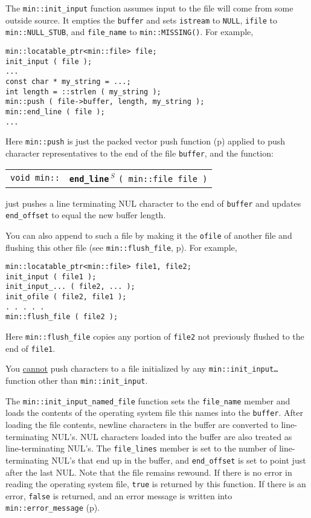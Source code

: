 \documentclass[12pt]{article}
\makeatletter
\newcommand{\ttindex}[1]{\index{#1@{\tt #1}}}
\newcommand{\minindex}[1]{\ttindex{min::#1}\ttindex{#1}}
\newcommand{\pagref}[1]{p\pageref{#1}}
\newcommand{\EOL}{\penalty \exhyphenpenalty}
\newenvironment{indpar}[1][0.3in]%
	{\begin{list}{}%
		     {\setlength{\itemsep}{0in}%
		      \setlength{\topsep}{0in}%
		      \setlength{\parsep}{1ex}%
		      \setlength{\labelwidth}{#1}%
		      \setlength{\leftmargin}{#1}%
		      \addtolength{\leftmargin}{\labelsep}}%
	 \item}%
	{\end{list}}
\newcommand{\LABEL}[1]{\label{#1}}
\newcommand{\MINKEY}[1]{{\tt \bf #1}\minindex{#1}}
\newcommand{\RESIZE}{$\,^S$}
\makeatother
\begin{document}
The {\tt min::init\_input} function assumes
input to the file will come from some outside source.  It empties the
{\tt buffer} and sets
{\tt istream} to {\tt NULL}, {\tt ifile} to {\tt min::\EOL NULL\_\EOL STUB},
and {\tt file\_\EOL name} to {\tt min::\EOL MISSING()}.
For example,\label{WRITING-FILE-BUFFER}
\begin{indpar}\begin{verbatim}
min::locatable_ptr<min::file> file;
init_input ( file );
...
const char * my_string = ...;
int length = ::strlen ( my_string );
min::push ( file->buffer, length, my_string );
min::end_line ( file );
...
\end{verbatim}\end{indpar}
Here {\tt min::push} is just the packed vector push function
(\pagref{MIN::PACKED_VEC_PUSH}) applied
to push character representatives
to the end of the file {\tt buffer}, and the function:

\begin{indpar}[1em]\begin{tabular}{r@{}l}
\verb|void min::|
    & \MINKEY{end\_line\RESIZE} \verb|( min::file file )|
\LABEL{MIN::END_LINE_FILE} \\
\end{tabular}\end{indpar}

just pushes a line terminating NUL character to the end of
{\tt buffer} and updates {\tt end\_\EOL offset} to equal the
new buffer length.

You can also append to such a file by making it the {\tt ofile}
of another file and flushing this other file
(see {\tt min::\EOL flush\_\EOL file}, \pagref{MIN::FLUSH_FILE}).
For example,
\begin{indpar}\begin{verbatim}
min::locatable_ptr<min::file> file1, file2;
init_input ( file1 );
init_input_... ( file2, ... );
init_ofile ( file2, file1 );
. . . . .
min::flush_file ( file2 );
\end{verbatim}\end{indpar}
Here {\tt min::\EOL flush\_\EOL file} copies any portion of
{\tt file2} not previously flushed to the end of {\tt file1}.

You \underline{cannot} push characters to a file initialized by any
{\tt min::\EOL init\_\EOL input\ldots} function other than
{\tt min::\EOL init\_\EOL input}.

The {\tt min::init\_input\_named\_file} function
sets the {\tt file\_\EOL name} member and
loads the contents of the operating system file this names into the
{\tt buffer}.
After loading the file contents, newline characters in the buffer
are converted to line-terminating NUL's.  NUL characters loaded into the
buffer are also treated as line-terminating NUL's.
The {\tt file\_\EOL lines} member is set to the number of line-terminating NUL's
that end up in the buffer, and {\tt end\_\EOL offset} is set to point
just after the last NUL.  Note that the file remains rewound.
If there is no error in
reading the operating system file, {\tt true} is returned by this function.  If
there is an error, {\tt false} is returned, and an error message
is written into {\tt min::\EOL error\_\EOL message}
(\pagref{ERROR_MESSAGE}).
\end{document}
